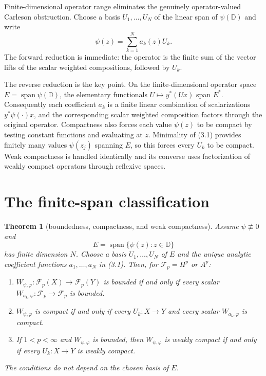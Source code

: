 \documentclass[11pt]{article}
\newtheorem{theorem}{Theorem}
\theoremstyle{remark}
\newcommand{\D}{\mathbb D}
\newcommand{\F}{\mathcal F}
\newcommand{\wc}{W_{\psi,\varphi}}
\newcommand{\wa}[1]{W_{#1,\varphi}}
\begin{document}
Finite-dimensional operator range eliminates the genuinely operator-valued
Carleson obstruction.  Choose a basis $U_1,\ldots,U_N$ of the linear span of
$\psi(\D)$ and write
\[
 \psi(z)=\sum_{k=1}^N a_k(z)U_k.
 \tag{3.1}
\]
The forward reduction is immediate: the operator is the finite sum of the
vector lifts of the scalar weighted compositions, followed by $U_k$.

The reverse reduction is the key point.  On the finite-dimensional operator
space $E=\operatorname{span}\psi(\D)$, the elementary functionals
$U\mapsto y^*(Ux)$ span $E^*$.  Consequently each coefficient $a_k$ is a
finite linear combination of scalarizations $y^*\psi(\cdot)x$, and the
corresponding scalar weighted composition factors through the original
operator.  Compactness also forces each value $\psi(z)$ to be compact by
testing constant functions and evaluating at $z$.  Minimality of (3.1)
provides finitely many values $\psi(z_j)$ spanning $E$, so this forces every
$U_k$ to be compact.  Weak compactness is handled identically and its converse
uses factorization of weakly compact operators through reflexive spaces.

\section{The finite-span classification}

\begin{theorem}[boundedness, compactness, and weak compactness]\label{thm:main}
Assume $\psi\not\equiv0$ and
\[
 E=\operatorname{span}\{\psi(z):z\in\D\}
\]
has finite dimension $N$.  Choose a basis $U_1,\ldots,U_N$ of $E$ and the
unique analytic coefficient functions $a_1,\ldots,a_N$ in (3.1).  Then, for
$\F_p=H^p$ or $A^p$:
\begin{enumerate}[label=\textup{(\roman*)}]
\item $\wc:\F_p(X)\to\F_p(Y)$ is bounded if and only if every scalar
$\wa{a_k}:\F_p\to\F_p$ is bounded.
\item $\wc$ is compact if and only if every $U_k:X\to Y$ and every scalar
$\wa{a_k}$ is compact.
\item If $1<p<\infty$ and $\wc$ is bounded, then $\wc$ is weakly compact if
and only if every $U_k:X\to Y$ is weakly compact.
\end{enumerate}
The conditions do not depend on the chosen basis of $E$.
\end{theorem}
\end{document}
